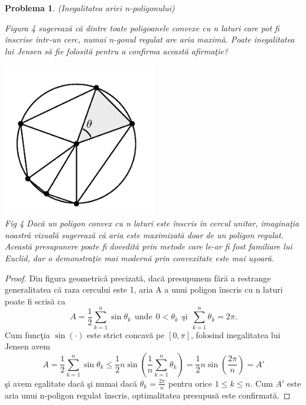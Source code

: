 \documentclass[a4paper,12pt,oneside]{report}
\newtheorem{problem}{Problema}
\begin{document}
\begin{problem} (Inegalitatea ariei n-poligonului)

Figura 4 sugereaz\u{a} c\u{a}  dintre toate poligoanele convexe cu n laturi care pot fi \^{i}nscrise \^{i}ntr-un cerc, numai n-gonul regulat are aria maxim\u{a}. Poate inegalitatea lui Jensen s\u{a} fie folosit\u{a} pentru a confirma aceast\u{a} afirma\c{t}ie?

\begin{center}
  \includegraphics[width=0.5\textwidth]{fig_pb6.png}
  \\ Fig 4 Dac\u{a} un poligon convex cu n laturi este \^{i}nscris \^{i}n cercul unitar, imagina\c{t}ia noastr\u{a} vizual\u{a} sugereaz\u{a} c\u{a} aria este maximizat\u{a} doar de un poligon regulat. Aceast\u{a} presupunere poate fi dovedit\u{a} prin metode care le-ar fi fost familiare lui Euclid, dar o demonstra\c{t}ie mai modern\u{a} prin convexitate este mai u\c{s}oar\u{a}.
\end{center}
\end{problem}
\begin{proof}
Din figura geometric\u{a} precizat\u{a}, dac\u{a} presupunem f\u{a}r\u{a} a restrange generalitatea c\u{a} raza cercului este 1, aria A a unui poligon \^{i}nscris cu n laturi poate fi scris\u{a} ca
\begin{displaymath}
  A = \frac{1}{2}\sum_{k = 1}^{n} \sin \theta _{k} ~~\text{unde} ~~0< \theta _{k} ~~\text{\c{s}i}~~ \sum_{k = 1}^n{\theta _{k}} = 2\pi.
\end{displaymath}
  Cum func\c{t}ia  \(\sin \left ( \cdot  \right )\) este strict concav\u{a} pe \(\left [ 0 , \pi  \right ]\), folosind inegalitatea lui Jensen avem
\begin{displaymath}
  A = \frac{1}{2}\sum_{k = 1}^{n} \sin \theta _{k}  \leq \frac{1}{2}n\sin\left ( \frac{1}{n}\sum_{k = 1}^{n}\theta _{k} \right ) = \frac{1}{2}n\sin \left ( \frac{2\pi }{n} \right ) = {A}'
\end{displaymath}
\c{s}i avem egalitate dac\u{a} \c{s}i numai dac\u{a} \(\theta _{k} = \frac{2\pi }{n}\) pentru orice \(1\leq k\leq n\). Cum \({A}'\) este aria unui n-poligon regulat \^{i}nscris, optimalitatea presupus\u{a} este confirmat\u{a}.
\end{proof}
\end{document}
